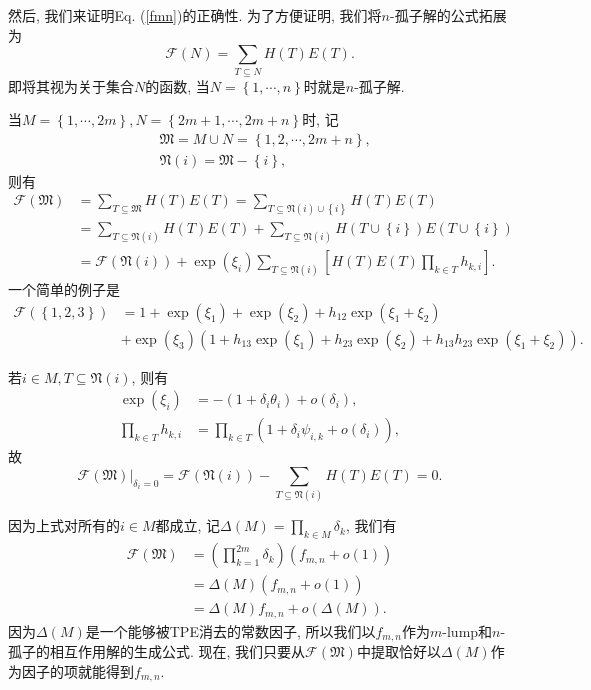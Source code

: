 \documentclass[12pt,a4paper,UTF8]{article}
\numberwithin{equation}{section}
\newcommand{\sbrace}[1]{\left(#1\right)}
\newcommand{\mbrace}[1]{\left[#1\right]}
\newcommand{\bbrace}[1]{\left\{#1\right\}}
\newcommand{\eval}[2]{\left.{#1}\right|_{#2}}
\newcommand{\FM}{\mathfrak{M}}
\newcommand{\FN}{\mathfrak{N}}
\newcommand{\CF}{\mathcal{F}}
\newcommand{\refeqn}[1]{Eq. (\ref{#1})}
\newcommand{\MLNS}{$m$-lump和$n$-孤子的相互作用解}
\begin{document}
然后, 我们来证明\refeqn{fmn}的正确性. 为了方便证明, 我们将$n$-孤子解的公式拓展为
\begin{equation}
  \CF(N)=\sum_{T\subseteq N}{H(T)E(T)}.
\end{equation}
即将其视为关于集合$N$的函数, 当$N=\bbrace{1,\cdots,n}$时就是$n$-孤子解. 

当$M=\bbrace{1,\cdots,2m},N=\bbrace{2m+1,\cdots,2m+n}$时, 记
\begin{equation}
\begin{aligned}
  &\FM=M\cup N = \bbrace{1,2,\cdots,2m+n}, \\ 
  &\FN(i)=\FM - \bbrace{i},
\end{aligned}
\end{equation}
则有
\begin{equation}
\begin{aligned}
  \CF(\FM)&=\sum_{T\subseteq \FM}{H(T)E(T)}=\sum_{T\subseteq \FN(i)\cup \bbrace{i}}{H(T)E(T)} \\
  &=\sum_{T\subseteq \FN(i)}{H(T)E(T)}+\sum_{T\subseteq \FN(i)}{H(T\cup \bbrace{i})E(T\cup \bbrace{i})} \\ 
  &=\CF(\FN(i))+\exp(\xi_i)\sum_{T\subseteq \FN(i)}\mbrace{H(T)E(T)\prod_{k\in T}{h_{k,i}}}. 
\end{aligned}
\end{equation}
一个简单的例子是
\begin{equation}
\begin{aligned}
\CF(\bbrace{1,2,3})&=1+\exp(\xi_1)+\exp(\xi_2)+h_{12}\exp(\xi_1+\xi_2)  \\ 
&+\exp(\xi_3)\sbrace{1+h_{13}\exp(\xi_1)+h_{23}\exp(\xi_2)+h_{13}h_{23}\exp(\xi_1+\xi_2)}.
\end{aligned}
\end{equation}

若$i\in M,T\subseteq \FN(i)$, 则有
\begin{equation}
\begin{aligned}
  \exp(\xi_i)&=-(1+\delta_i \theta_i)+o(\delta_i), \\ 
  \prod_{k\in T}{h_{k,i}}&=\prod_{k\in T}\sbrace{1+\delta_i \psi_{i,k}+o(\delta_i)} ,
\end{aligned}
\end{equation}
故
\begin{equation}
  \eval{\CF(\FM)}{\delta_i=0}=\CF(\FN(i))-\sum_{T\subseteq \FN(i)}{H(T)E(T)}=0. 
\end{equation}

因为上式对所有的$i\in M$都成立, 记$\Delta(M)=\prod_{k\in M}{\delta_k}$, 我们有
\begin{equation}
\begin{aligned}
  \CF(\FM)&=\sbrace{\prod_{k=1}^{2m}{\delta_k}}\sbrace{f_{m,n}+o(1)}\\
  &=\Delta(M)\sbrace{f_{m,n}+o(1)} \\
  &=\Delta(M)f_{m,n}+o\sbrace{\Delta(M)}. 
\end{aligned}
\label{fmn-o}
\end{equation}
因为$\Delta(M)$是一个能够被TPE消去的常数因子, 所以我们以$f_{m,n}$作为\MLNS{}的生成公式. 现在, 我们只要从$\CF(\FM)$中提取恰好以$\Delta(M)$作为因子的项就能得到$f_{m,n}$.
\end{document}
